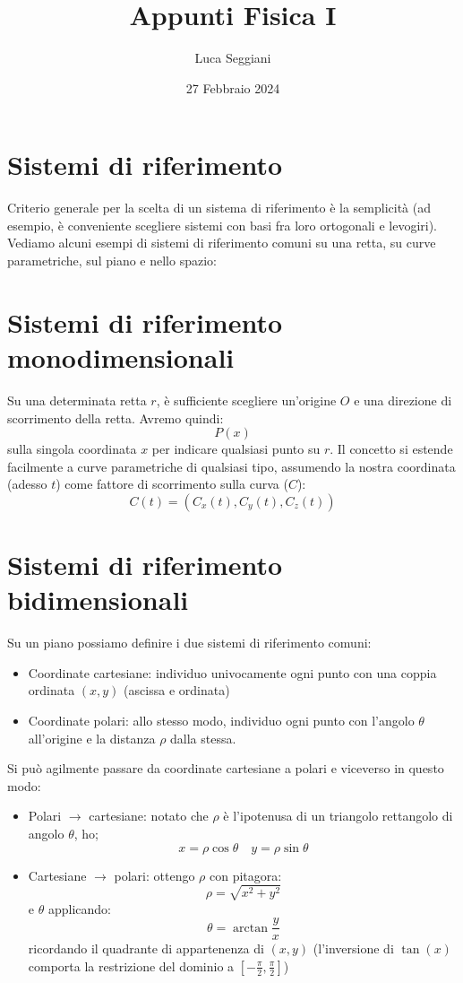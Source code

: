 \documentclass[a4paper,12pt]{article}
\title{Appunti Fisica I}
\author{Luca Seggiani}
\date{27 Febbraio 2024}
\begin{document}
\maketitle

\section{Sistemi di riferimento}
Criterio generale per la scelta di un sistema di riferimento è la semplicità (ad esempio, è conveniente
scegliere sistemi con basi fra loro ortogonali e levogiri). Vediamo alcuni esempi di sistemi di riferimento
comuni su una retta, su curve parametriche, sul piano e nello spazio:

\section{Sistemi di riferimento monodimensionali}
Su una determinata retta $r$, è sufficiente scegliere un'origine $O$ e una direzione di scorrimento della 
retta. Avremo quindi:
$$ P(x) $$
sulla singola coordinata $x$ per indicare qualsiasi punto su $r$. Il concetto si estende facilmente a curve
parametriche di qualsiasi tipo, assumendo la nostra coordinata (adesso $t$) come fattore di scorrimento sulla 
curva ($C$):
$$ C(t) = (C_x(t), C_y(t), C_z(t)) $$

\section{Sistemi di riferimento bidimensionali}
Su un piano possiamo definire i due sistemi di riferimento comuni:
\begin{itemize}
  \item Coordinate cartesiane:
    individuo univocamente ogni punto con una coppia ordinata $ (x, y) $ (ascissa e ordinata)
  \item Coordinate polari:
    allo stesso modo, individuo ogni punto con l'angolo $\theta$ all'origine e la distanza $\rho$ dalla stessa.
\end{itemize}

Si può agilmente passare da coordinate cartesiane a polari e viceverso in questo modo:
\begin{itemize}
  \item Polari $\rightarrow{}$ cartesiane:
    notato che $\rho$ è l'ipotenusa di un triangolo rettangolo di angolo $\theta$, ho;
    $$ x = \rho \cos{\theta} \quad y = \rho \sin{\theta} $$
  \item Cartesiane $\rightarrow{}$ polari:
    ottengo $\rho$ con pitagora:
    $$ \rho = \sqrt{x^2 + y^2} $$
    e $\theta$ applicando:
    $$ \theta = \arctan{\frac{y}{x}} $$
    ricordando il quadrante di appartenenza di $(x, y)$ (l'inversione di $\tan(x)$ comporta la restrizione
    del dominio a $[-\frac{\pi}{2}, \frac{\pi}{2}]$)
\end{itemize}
\end{document}

